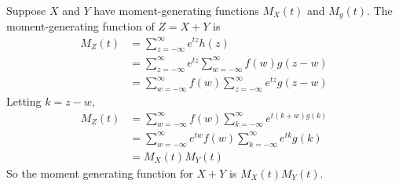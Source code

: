 \documentclass[12pt]{article}
\begin{document}
\begin{ex}
	Suppose $X$ and $Y$ have moment-generating functions $M_X(t)$ and $M_y(t)$. The moment-generating function of $Z=X+Y$ is
	\begin{align*}
		M_Z(t) &= \sum_{z=-\infty}^\infty e^{tz}h(z) \\
		       &= \sum_{z=-\infty}^\infty e^{tz} \sum_{w=-\infty}^\infty f(w)g(z-w) \\
		       &= \sum_{w=-\infty}^\infty f(w)\sum_{z=-\infty}^\infty e^{tz}g(z-w)
	\end{align*}
	Letting $k=z-w$,
	\begin{align*}
		M_Z(t) &= \sum_{w=-\infty}^\infty f(w) \sum_{k=-\infty}^\infty e^{t(k+w)g(k)} \\
		       &= \sum_{w=-\infty}^\infty e^{tw}f(w)\sum_{k=-\infty}^\infty e^{tk}g(k) \\
		       &= M_X(t)M_Y(t)
	\end{align*}
	So the moment generating function for $X+Y$ is $M_X(t)M_Y(t)$.
\end{ex}
\end{document}
